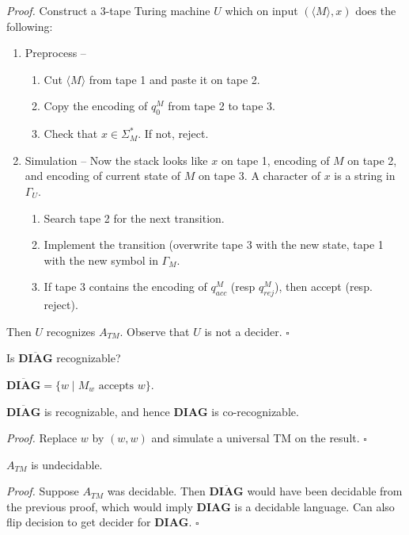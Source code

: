 \documentclass[a4paper]{article}
\newenvironment{proof}{\begin{breakbox}\textit{Proof.}}{\hfill$\square$\end{breakbox}}
\newcommand{\nl}{\vspace{0.2cm}\\}
\newcommand{\mf}{\mathbf}
\newcommand{\comp}{\overline}
\begin{document}
\begin{proof}
    Construct a 3-tape Turing machine $U$ which on input $(\langle M \rangle, x)$ does the following:
    \begin{enumerate}
        \item Preprocess --
            \begin{enumerate}
                \item Cut $\langle M \rangle$ from tape 1 and paste it on tape 2.
                \item Copy the encoding of $q_0^M$ from tape 2 to tape 3.
                \item Check that $x \in \Sigma_M^*$. If not, reject.
            \end{enumerate}
        \item Simulation -- Now the stack looks like $x$ on tape 1, encoding of $M$ on tape 2, and encoding of current state of $M$ on tape 3. A character of $x$ is a string in $\Gamma_U$.
            \begin{enumerate}
                \item Search tape 2 for the next transition.
                \item Implement the transition (overwrite tape 3 with the new state, tape 1 with the new symbol in $\Gamma_M$.
                \item If tape 3 contains the encoding of $q_{acc}^M$ (resp $q_{rej}^M$), then accept (resp. reject).
            \end{enumerate}
    \end{enumerate}
    Then $U$ recognizes $A_{TM}$. Observe that $U$ is not a decider.
\end{proof}

\begin{ques}
    Is $\comp{\mf{DIAG}}$ recognizable?
\end{ques}

$\comp{\mf{DIAG}} = \{w \mid M_w \text{ accepts }w\}$.\nl

\begin{theorem}
    $\comp{\mf{DIAG}}$ is recognizable, and hence $\mf{DIAG}$ is co-recognizable.
\end{theorem}

\begin{proof}
    Replace $w$ by $(w, w)$ and simulate a universal TM on the result.
\end{proof}

\begin{theorem}
    $A_{TM}$ is undecidable.
\end{theorem}

\begin{proof}
    Suppose $A_{TM}$ was decidable. Then $\comp{\mf{DIAG}}$ would have been decidable from the previous proof, which would imply $\mf{DIAG}$ is a decidable language. Can also flip decision to get
    decider for $\mf{DIAG}$.
\end{proof}
\end{document}

